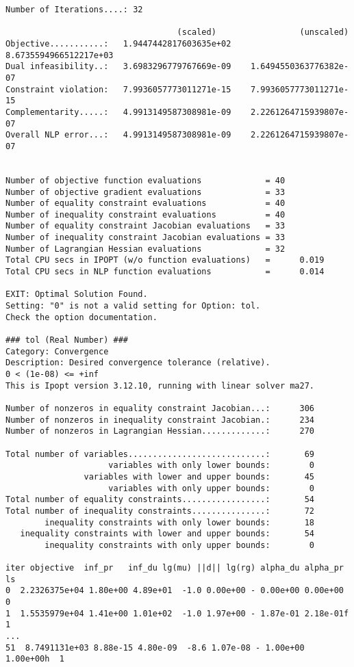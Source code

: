 \begin{lstlisting}
Number of Iterations....: 32

                                   (scaled)                 (unscaled)
Objective...........:   1.9447442817603635e+02    8.6735594966512217e+03
Dual infeasibility..:   3.6983296779767669e-09    1.6494550363776382e-07
Constraint violation:   7.9936057773011271e-15    7.9936057773011271e-15
Complementarity.....:   4.9913149587308981e-09    2.2261264715939807e-07
Overall NLP error...:   4.9913149587308981e-09    2.2261264715939807e-07


Number of objective function evaluations             = 40
Number of objective gradient evaluations             = 33
Number of equality constraint evaluations            = 40
Number of inequality constraint evaluations          = 40
Number of equality constraint Jacobian evaluations   = 33
Number of inequality constraint Jacobian evaluations = 33
Number of Lagrangian Hessian evaluations             = 32
Total CPU secs in IPOPT (w/o function evaluations)   =      0.019
Total CPU secs in NLP function evaluations           =      0.014

EXIT: Optimal Solution Found.
Setting: "0" is not a valid setting for Option: tol. 
Check the option documentation.

### tol (Real Number) ###
Category: Convergence
Description: Desired convergence tolerance (relative).
0 < (1e-08) <= +inf
This is Ipopt version 3.12.10, running with linear solver ma27.

Number of nonzeros in equality constraint Jacobian...:      306
Number of nonzeros in inequality constraint Jacobian.:      234
Number of nonzeros in Lagrangian Hessian.............:      270

Total number of variables............................:       69
                     variables with only lower bounds:        0
                variables with lower and upper bounds:       45
                     variables with only upper bounds:        0
Total number of equality constraints.................:       54
Total number of inequality constraints...............:       72
        inequality constraints with only lower bounds:       18
   inequality constraints with lower and upper bounds:       54
        inequality constraints with only upper bounds:        0

iter objective  inf_pr   inf_du lg(mu) ||d|| lg(rg) alpha_du alpha_pr  ls
0  2.2326375e+04 1.80e+00 4.89e+01  -1.0 0.00e+00 - 0.00e+00 0.00e+00   0
1  1.5535979e+04 1.41e+00 1.01e+02  -1.0 1.97e+00 - 1.87e-01 2.18e-01f  1
...
51  8.7491131e+03 8.88e-15 4.80e-09  -8.6 1.07e-08 - 1.00e+00 1.00e+00h  1


\end{lstlisting}
